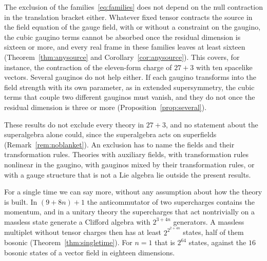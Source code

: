 The exclusion of the families~\eqref{eq:families} does not depend on the null contraction in the translation bracket either. Whatever fixed tensor contracts the source in the field equation of the gauge field, with or without a constraint on the gaugino, the cubic gaugino terms cannot be absorbed once the residual dimension is sixteen or more, and every real frame in these families leaves at least sixteen (Theorem~\ref{thm:anysource} and Corollary~\ref{cor:anysource}). This covers, for instance, the contraction of the eleven-form charge of $27+3$ with ten spacelike vectors. Several gauginos do not help either. If each gaugino transforms into the field strength with its own parameter, as in extended supersymmetry, the cubic terms that couple two different gauginos must vanish, and they do not once the residual dimension is three or more (Proposition~\ref{prop:several}).

These results do not exclude every theory in $27+3$, and no statement about the superalgebra alone could, since the superalgebra acts on superfields (Remark~\ref{rem:noblanket}). An exclusion has to name the fields and their transformation rules. Theories with auxiliary fields, with transformation rules nonlinear in the gaugino, with gauginos mixed by their transformation rules, or with a gauge structure that is not a Lie algebra lie outside the present results.

For a single time we can say more, without any assumption about how the theory is built. In $(9+8n)+1$ the anticommutator of two supercharges contains the momentum, and in a unitary theory the supercharges that act nontrivially on a massless state generate a Clifford algebra with $2^{3+4n}$ generators. A massless multiplet without tensor charges then has at least $2^{2^{2+4n}}$ states, half of them bosonic (Theorem~\ref{thm:singletime}). For $n=1$ that is $2^{64}$ states, against the $16$ bosonic states of a vector field in eighteen dimensions.

